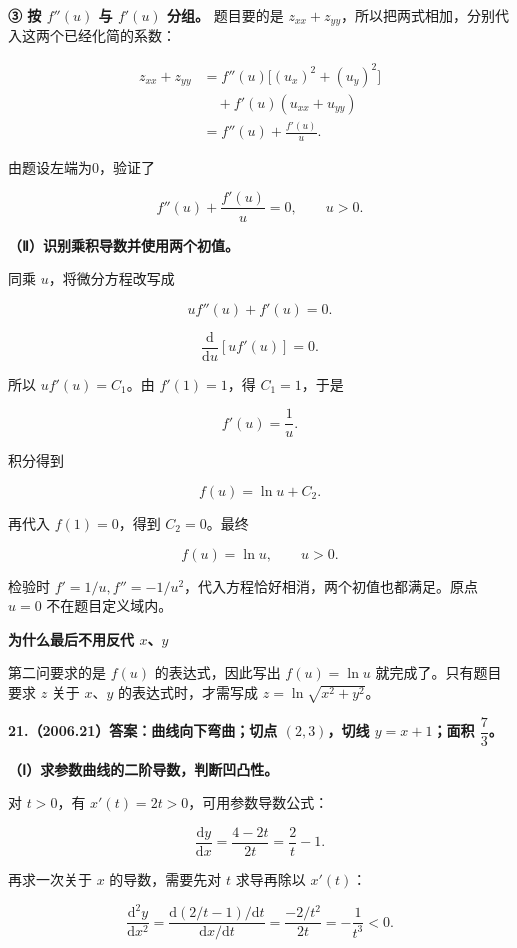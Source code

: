 \documentclass[UTF8,11pt,fontset=windows]{ctexart}
\begin{document}
\textbf{③ 按 $f''(u)$ 与 $f'(u)$ 分组。} 题目要的是 $z_{xx}+z_{yy}$，所以把两式相加，分别代入这两个已经化简的系数：

$$
\begin{aligned}
z_{xx}+z_{yy}
&=f''(u)\bigl[(u_x)^2+(u_y)^2\bigr]\\
&\quad+f'(u)(u_{xx}+u_{yy})\\
&=f''(u)+\frac{f'(u)}u.
\end{aligned}
$$

由题设左端为0，验证了

$$
\boxed{f''(u)+\frac{f'(u)}u=0,\qquad u>0.}
$$

\textbf{（Ⅱ）识别乘积导数并使用两个初值。}

同乘 $u$，将微分方程改写成

$$
u f''(u)+f'(u)=0.
$$

$$
\frac{\mathrm d}{\mathrm du}[u f'(u)]=0.
$$

所以 $u f'(u)=C_1$。由 $f'(1)=1$，得 $C_1=1$，于是

$$
f'(u)=\frac1u.
$$

积分得到

$$
f(u)=\ln u+C_2.
$$

再代入 $f(1)=0$，得到 $C_2=0$。最终

$$
\boxed{f(u)=\ln u,\qquad u>0.}
$$

检验时 $f'=1/u,f''=-1/u^2$，代入方程恰好相消，两个初值也都满足。原点 $u=0$ 不在题目定义域内。

{\bfseries 为什么最后不用反代 $x$、$y$\par}
第二问要求的是 $f(u)$ 的表达式，因此写出 $f(u)=\ln u$ 就完成了。只有题目要求 $z$ 关于 $x$、$y$ 的表达式时，才需写成 $z=\ln\sqrt{x^2+y^2}$。

\clearpage

\textbf{21.（2006.21）答案：曲线向下弯曲；切点 $(2,3)$，切线 $y=x+1$；面积 $\dfrac73$。}

\textbf{（Ⅰ）求参数曲线的二阶导数，判断凹凸性。}

对 $t>0$，有 $x'(t)=2t>0$，可用参数导数公式：

$$
\frac{\mathrm dy}{\mathrm dx}
=\frac{4-2t}{2t}=\frac2t-1.
$$

再求一次关于 $x$ 的导数，需要先对 $t$ 求导再除以 $x'(t)$：

$$
\frac{\mathrm d^2y}{\mathrm dx^2}
=\frac{\mathrm d(2/t-1)/\mathrm dt}{\mathrm dx/\mathrm dt}
=\frac{-2/t^2}{2t}
=-\frac1{t^3}<0.
$$
\end{document}
